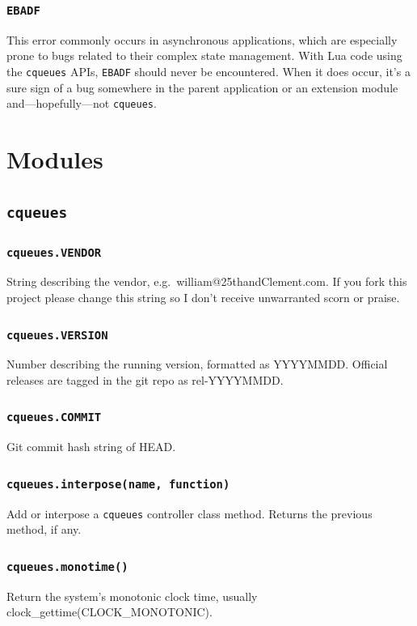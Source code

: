 \documentclass[11pt, oneside]{memoir}
\newcommand*{\cqueues}[0]{\texttt{cqueues}\xspace}
\newcommand*{\routine}[1]{\texttt{#1}\xspace}
\newcommand*{\errno}[1]{\texttt{#1}\xspace}
\newcounter{toccols}
\newenvironment{Module}[1]{
	\subsection{\texttt{#1}}
	\addtocontents{toc}{
		\protect\begin{multicols}{\value{toccols}}
	}
}{
	\addtocontents{toc}{\protect\end{multicols}}
}
\begin{document}
\subsubsection{\texttt{EBADF}}

This error commonly occurs in asynchronous applications, which are especially prone to bugs related to their complex state management. With Lua code using the \cqueues APIs, \errno{EBADF} should never be encountered. When it does occur, it's a sure sign of a bug somewhere in the parent application or an extension module and---hopefully---not \cqueues.

\section{Modules}

\begin{Module}{\cqueues}

\subsubsection{\routine{cqueues.VENDOR}}
String describing the vendor, e.g.\ william@25thandClement.com. If you fork this project please change this string so I don't receive unwarranted scorn or praise.

\subsubsection{\routine{cqueues.VERSION}}
Number describing the running version, formatted as YYYYMMDD. Official releases are tagged in the git repo as rel-YYYYMMDD.

\subsubsection{\routine{cqueues.COMMIT}}
Git commit hash string of HEAD.

\subsubsection[\routine{cqueues.interpose}]{\routine{cqueues.interpose(name, function)}}
Add or interpose a \cqueues controller class method. Returns the previous method, if any.

\subsubsection[\routine{cqueues.monotime}]{\routine{cqueues.monotime()}}
Return the system's monotonic clock time, usually clock\_gettime(CLOCK\_MONOTONIC).


\end{Module}
\end{document}
